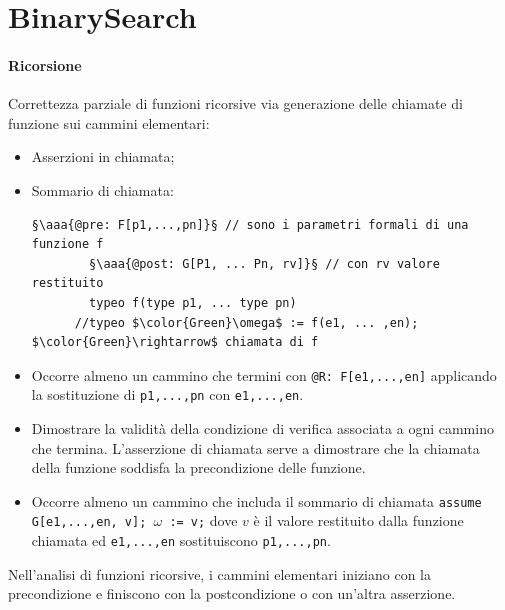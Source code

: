 \section{BinarySearch}
\paragraph{Ricorsione}Correttezza parziale di funzioni ricorsive via generazione delle chiamate di funzione sui cammini elementari:
\begin{itemize}
	\item Asserzioni in chiamata;
	\item Sommario di chiamata:
	\begin{lstlisting}[caption={profilo della funzione f}]
		§\aaa{@pre: F[p1,...,pn]}§ // sono i parametri formali di una funzione f
		§\aaa{@post: G[P1, ... Pn, rv]}§ // con rv valore restituito
		typeo f(type p1, ... type pn)   
	  //typeo $\color{Green}\omega$ := f(e1, ... ,en); $\color{Green}\rightarrow$ chiamata di f
	\end{lstlisting}
	\item Occorre almeno un cammino che termini con \texttt{@R: F[e1,...,en]} applicando la sostituzione di \texttt{p1,...,pn} con \texttt{e1,...,en}.
	\item Dimostrare la validità della condizione di verifica associata a ogni cammino che termina. L'asserzione di chiamata serve a dimostrare che la chiamata della funzione soddisfa la precondizione delle funzione.
	\item Occorre almeno un cammino che includa il sommario di chiamata \texttt{assume G[e1,...,en, v]; $\omega$ := v;} dove $v$ è il valore restituito dalla funzione chiamata ed \texttt{e1,...,en} sostituiscono \texttt{p1,...,pn}.
\end{itemize}
Nell'analisi di funzioni ricorsive, i cammini elementari iniziano con la precondizione e finiscono con la postcondizione o con un'altra asserzione.
